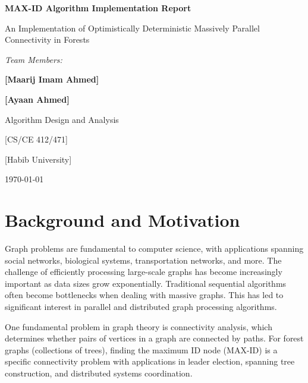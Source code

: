 \documentclass[11pt,a4paper]{article}
\begin{document}
\begin{titlepage}
    \centering
    \vspace*{1cm}
    {\Huge\bfseries MAX-ID Algorithm Implementation Report\par}
    \vspace{1.5cm}
    {\Large An Implementation of Optimistically Deterministic Massively Parallel Connectivity in Forests\par}
    \vspace{2cm}
    
    {\Large\itshape Team Members:\par}
    \vspace{0.5cm}
    {\large\bfseries [Maarij Imam Ahmed]\par}
    \vspace{0.3cm}
    {\large\bfseries [Ayaan Ahmed]\par}
    \vspace{2cm}
    
    {\Large Algorithm Design and Analysis\par}
    {\Large [CS/CE 412/471]\par}
    \vspace{0.5cm}
    {\large [Habib University]\par}
    \vspace{1cm}
    
    {\large \today\par}
\end{titlepage}

\tableofcontents
\newpage

\section{Background and Motivation}

Graph problems are fundamental to computer science, with applications spanning social networks, biological systems, transportation networks, and more. The challenge of efficiently processing large-scale graphs has become increasingly important as data sizes grow exponentially. Traditional sequential algorithms often become bottlenecks when dealing with massive graphs. This has led to significant interest in parallel and distributed graph processing algorithms.

One fundamental problem in graph theory is connectivity analysis, which determines whether pairs of vertices in a graph are connected by paths. For forest graphs (collections of trees), finding the maximum ID node (MAX-ID) is a specific connectivity problem with applications in leader election, spanning tree construction, and distributed systems coordination.
\end{document}
